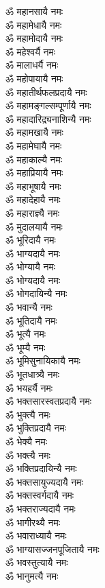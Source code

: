 \begin{flushleft}
\begin{multicols}{2}
ॐ महानसायै नमः\\
ॐ महामेधायै नमः\\
ॐ महामोदायै नमः\\
ॐ महेश्वर्यै नमः\\
ॐ मालाधर्यै नमः\\
ॐ महोपायायै नमः\hfill{}\\
ॐ महातीर्थफलप्रदायै नमः\\
ॐ महामङ्गल्सम्पूर्णायै नमः\\
ॐ महादारिद्र्यनाशिन्यै नमः\\
ॐ महामखायै नमः\\
ॐ महामेघायै नमः\\
ॐ महाकाल्यै नमः\\
ॐ महाप्रियायै नमः\\
ॐ महाभूषायै नमः\\
ॐ महादेहायै नमः\\
ॐ महाराज्ञ्यै नमः\hfill{}\\
ॐ मुदालयायै नमः\\
ॐ भूरिदायै नमः\\
ॐ भाग्यदायै नमः\\
ॐ भोग्यायै नमः\\
ॐ भोग्यदायै नमः\\
ॐ भोगदायिन्यै नमः\\
ॐ भवान्यै नमः\\
ॐ भूतिदायै नमः\\
ॐ भूत्यै नमः\\
ॐ भूम्यै नमः\hfill{}\\
ॐ भूमिसुनायिकायै नमः\\
ॐ भूतधात्र्यै नमः\\
ॐ भयहर्यै नमः\\
ॐ भक्तसारस्वतप्रदायै नमः\\
ॐ भुक्त्यै नमः\\
ॐ भुक्तिप्रदायै नमः\\
ॐ भेक्यै नमः\\
ॐ भक्त्यै नमः\\
ॐ भक्तिप्रदायिन्यै नमः\\
ॐ भक्तसायुज्यदायै नमः\hfill{}\\
ॐ भक्तस्वर्गदायै नमः\\
ॐ भक्तराज्यदायै नमः\\
ॐ भागीरथ्यै नमः\\
ॐ भवाराध्यायै नमः\\
ॐ भाग्यासज्जनपूजितायै नमः\\
ॐ भवस्तुत्यायै नमः\\
ॐ भानुमत्यै नमः\\

\end{multicols}
\end{flushleft}
